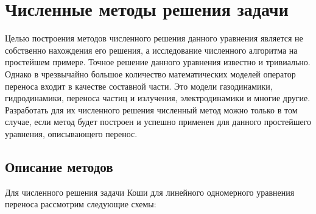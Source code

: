 \documentclass[12pt, a4paper]{article}
\begin{document}
\section{Численные методы решения задачи}
Целью построения методов численного решения данного уравнения является не собственно нахождения его решения, а исследование численного алгоритма на простейшем примере. Точное решение данного уравнения известно и тривиально. Однако в чрезвычайно большое количество математических моделей оператор переноса входит в качестве составной части. Это модели газодинамики, гидродинамики, переноса частиц и излучения, электродинамики и многие другие. Разработать для их численного решения численный метод можно только в том случае, если метод будет построен и успешно применен для данного простейшего уравнения, описывающего перенос.
\subsection{Описание методов}
Для численного решения задачи Коши для линейного одномерного уравнения переноса рассмотрим следующие схемы:
\end{document}

